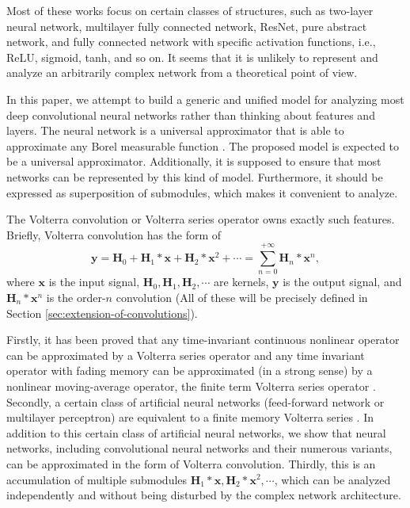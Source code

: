 \documentclass[twoside,11pt]{article}
\def\tvar#1{\mathbf{#1}} %
\begin{document}
Most of these works focus on certain classes of structures, such as two-layer neural network, multilayer fully connected network, ResNet, pure abstract network, and fully connected network with specific activation functions, i.e., ReLU, sigmoid, tanh, and so on.
It seems that it is unlikely to represent and analyze an arbitrarily complex network from a theoretical point of view.

In this paper, we attempt to build a generic and unified model for analyzing most deep convolutional neural networks rather than thinking about features and layers.
The neural network is a universal approximator that is able to approximate any Borel measurable function \citep{Cybenko1989,Hornik1989,Barron1993,Jinshan2021}.
The proposed model is expected to be a universal approximator.
Additionally, it is supposed to ensure that most networks can be represented by this kind of model.
Furthermore, it should be expressed as superposition of submodules, which makes it convenient to analyze.

The Volterra convolution or Volterra series operator \citep{volterra1932theory} owns exactly such features.
Briefly, Volterra convolution has the form of
\begin{equation}
  \tvar{y}
  = \tvar{H}_0 + \tvar{H}_1 * \tvar{x} + \tvar{H}_2 * \tvar{x}^2 + \cdots
  = \sum_{n=0}^{+\infty} \tvar{H}_n * \tvar{x}^n,
  \label{equ:original-definition-infty-Volterra-convolution}
\end{equation}
where \(\tvar{x}\) is the input signal, \(\tvar{H}_0, \tvar{H}_1, \tvar{H}_2, \cdots\) are kernels, \(\tvar{y}\) is the output signal, and \(\tvar{H}_n * \tvar{x}^n\) is the order-\(n\) convolution (All of these will be precisely defined in Section \ref{sec:extension-of-convolutions}).

Firstly, it has been proved that any time-invariant continuous nonlinear operator can be approximated by a Volterra series operator and any time invariant operator with fading memory can be approximated (in a strong sense) by a nonlinear moving-average operator, the finite term Volterra series operator \citep{Boyd1985}.
Secondly, a certain class of artificial neural networks (feed-forward network or multilayer perceptron) are equivalent to a finite memory Volterra series \citep{Wray1994, Fung1996}.
In addition to this certain class of artificial neural networks, we show that neural networks, including convolutional neural networks and their numerous variants, can be approximated in the form of Volterra convolution.
Thirdly, this is an accumulation of multiple submodules \(\tvar{H}_1 * \tvar{x}, \tvar{H}_2 * \tvar{x}^2, \cdots\), which can be analyzed independently and without being disturbed by the complex network architecture.
\end{document}

